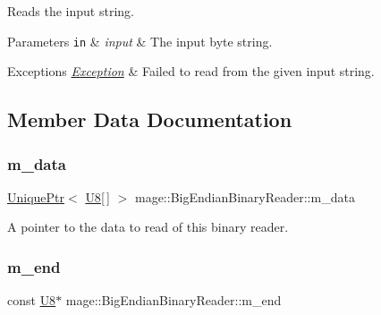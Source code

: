 Reads the input string.


\begin{DoxyParams}[1]{Parameters}
\mbox{\tt in}  & {\em input} & The input byte string. \\
\hline
\end{DoxyParams}

\begin{DoxyExceptions}{Exceptions}
{\em \mbox{\hyperlink{classmage_1_1_exception}{Exception}}} & Failed to read from the given input string. \\
\hline
\end{DoxyExceptions}


\subsection{Member Data Documentation}
\mbox{\label{classmage_1_1_big_endian_binary_reader_a54128bdaa233c1bd20494189b2397fe3}} 
\subsubsection{\texorpdfstring{m\+\_\+data}{m\_data}}
{\footnotesize\ttfamily \mbox{\hyperlink{namespacemage_a3316d7143a973e37adf1110f2e80ca31}{Unique\+Ptr}}$<$ \mbox{\hyperlink{namespacemage_afc638980bc6154f15af5e2d93a0e0ea9}{U8}}\mbox{[}$\,$\mbox{]} $>$ mage\+::\+Big\+Endian\+Binary\+Reader\+::m\+\_\+data\hspace{0.3cm}{\ttfamily [private]}}

A pointer to the data to read of this binary reader. \mbox{\label{classmage_1_1_big_endian_binary_reader_ab4f707d30799b98afed0f9adfc27a3e2}} 
\subsubsection{\texorpdfstring{m\+\_\+end}{m\_end}}
{\footnotesize\ttfamily const \mbox{\hyperlink{namespacemage_afc638980bc6154f15af5e2d93a0e0ea9}{U8}}$\ast$ mage\+::\+Big\+Endian\+Binary\+Reader\+::m\+\_\+end\hspace{0.3cm}{\ttfamily [private]}}


